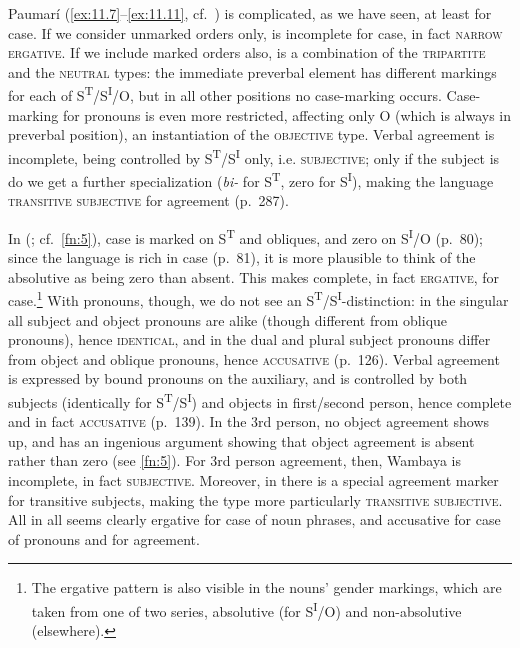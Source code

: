 \documentclass[output=paper]{langsci/langscibook}
\begin{document}
Paumarí (\eqref{ex:11.7}--\eqref{ex:11.11}, cf.\ \citealt{ChapmanDerbyshire1991}) is complicated, as we
have seen, at least for case. If we consider unmarked orders only,  is
incomplete for case, in fact \textsc{narrow ergative}. If we include marked
orders also,  is a combination of the \textsc{tripartite} and the
\textsc{neutral} types: the immediate preverbal element has different markings
for each of S\textsuperscript{T}/S\textsuperscript{I}/O, but in all other
positions no case-marking occurs. Case-marking for pronouns is even more
restricted, affecting only O (which is always in preverbal position), an
instantiation of the \textsc{objective} type. Verbal agreement is incomplete,
being controlled by S\textsuperscript{T}/S\textsuperscript{I} only, i.e.
\textsc{subjective}; only if the subject is \Tsg{} do we get a further
specialization (\emph{bi-} for S\textsuperscript{T}, zero for
S\textsuperscript{I}), making the language \textsc{transitive subjective} for
\Tsg{} agreement (p.\ 287).

In  (\citealt{Nordlinger1998}; cf.\ \cref{fn:5}), case is marked on
S\textsuperscript{T} and obliques, and zero on S\textsuperscript{I}/O (p.\ 80);
since the language is rich in case (p.\ 81), it is more plausible to think of the
absolutive as being zero than absent. This makes  complete, in fact
\textsc{ergative}, for case.\footnote{The ergative pattern is also visible in
the nouns’ gender markings, which are taken from one of two series, absolutive
(for S\textsuperscript{I}/O) and non-absolutive (elsewhere).\label{fn:13}} With
pronouns, though, we do not see an
S\textsuperscript{T}/S\textsuperscript{I}{}-distinction: in the singular all
subject and object pronouns are alike (though different from oblique pronouns),
hence \textsc{identical}, and in the dual and plural subject pronouns differ
from object and oblique pronouns, hence \textsc{accusative} (p.\ 126). Verbal
agreement is expressed by bound pronouns on the auxiliary, and is controlled by
both subjects (identically for S\textsuperscript{T}/S\textsuperscript{I}) and
objects in first/second person, hence complete and in fact \textsc{accusative}
(p.\ 139). In the 3rd person, no object agreement shows up, and
\citet{Nordlinger1998} has an ingenious argument showing that object agreement
is absent rather than zero (see \cref{fn:5}). For 3rd person agreement, then,
Wambaya is incomplete, in fact \textsc{subjective}. Moreover, in \Tsg{} there
is a special agreement marker for transitive subjects, making the type more
particularly \textsc{transitive subjective}. All in all  seems clearly
ergative for case of noun phrases, and accusative for case of pronouns and for
agreement.
\end{document}
